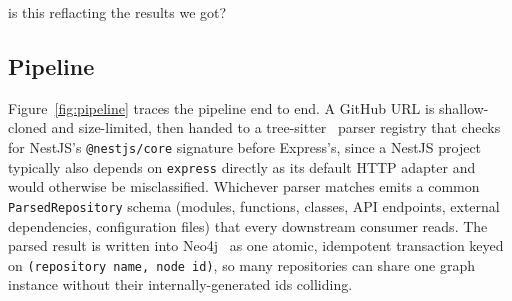 is this reflacting the results we got?\documentclass[conference]{IEEEtran}
\begin{document}
\subsection{Pipeline}
Figure~\ref{fig:pipeline} traces the pipeline end to end. A GitHub URL is shallow-cloned and
size-limited, then handed to a tree-sitter~\cite{treesitter} parser registry that checks for
NestJS's \texttt{@nestjs/core} signature before Express's, since a NestJS project typically also
depends on \texttt{express} directly as its default HTTP adapter and would otherwise be
misclassified. Whichever parser matches emits a common \texttt{ParsedRepository} schema
(modules, functions, classes, API endpoints, external dependencies, configuration files) that
every downstream consumer reads. The parsed result is written into Neo4j~\cite{neo4j} as one
atomic, idempotent transaction keyed on \texttt{(repository name, node id)}, so many
repositories can share one graph instance without their internally-generated ids colliding.
\end{document}
